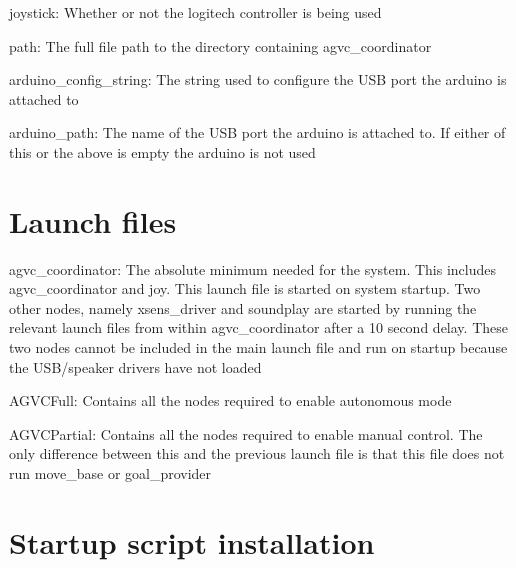 \begin{DoxyItemize}
\item {\ttfamily joystick\-:} \-Whether or not the logitech controller is being used
\item {\ttfamily path\-:} \-The full file path to the directory containing agvc\-\_\-coordinator
\item {\ttfamily arduino\-\_\-config\-\_\-string\-:} \-The string used to configure the \-U\-S\-B port the arduino is attached to
\item {\ttfamily arduino\-\_\-path\-:} \-The name of the \-U\-S\-B port the arduino is attached to. \-If either of this or the above is empty the arduino is not used
\end{DoxyItemize}\hypertarget{index_launch}{}\section{\-Launch files}\label{index_launch}

\begin{DoxyItemize}
\item {\ttfamily agvc\-\_\-coordinator\-:} \-The absolute minimum needed for the system. \-This includes agvc\-\_\-coordinator and joy. \-This launch file is started on system startup. \-Two other nodes, namely xsens\-\_\-driver and soundplay are started by running the relevant launch files from within agvc\-\_\-coordinator after a 10 second delay. \-These two nodes cannot be included in the main launch file and run on startup because the \-U\-S\-B/speaker drivers have not loaded
\item {\ttfamily \-A\-G\-V\-C\-Full\-:} \-Contains all the nodes required to enable autonomous mode
\item {\ttfamily \-A\-G\-V\-C\-Partial\-:} \-Contains all the nodes required to enable manual control. \-The only difference between this and the previous launch file is that this file does not run move\-\_\-base or goal\-\_\-provider
\end{DoxyItemize}\hypertarget{index_script}{}\section{\-Startup script installation}\label{index_script}

